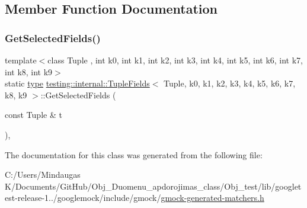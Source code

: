 \subsection{Member Function Documentation}
\mbox{\label{classtesting_1_1internal_1_1_tuple_fields_a020eefb4630e6dffe8bcadd0a70b1bab}} 
\subsubsection{\texorpdfstring{GetSelectedFields()}{GetSelectedFields()}}
{\footnotesize\ttfamily template$<$class Tuple , int k0, int k1, int k2, int k3, int k4, int k5, int k6, int k7, int k8, int k9$>$ \\
static \mbox{\hyperlink{classtesting_1_1internal_1_1_tuple_fields_a5480877377ebc94bf3a6c6cab5c369bc}{type}} \mbox{\hyperlink{classtesting_1_1internal_1_1_tuple_fields}{testing\+::internal\+::\+Tuple\+Fields}}$<$ Tuple, k0, k1, k2, k3, k4, k5, k6, k7, k8, k9 $>$\+::Get\+Selected\+Fields (\begin{DoxyParamCaption}\item[{const Tuple \&}]{t }\end{DoxyParamCaption})\hspace{0.3cm}{\ttfamily [inline]}, {\ttfamily [static]}}



The documentation for this class was generated from the following file\+:\begin{DoxyCompactItemize}
\item 
C\+:/\+Users/\+Mindaugas K/\+Documents/\+Git\+Hub/\+Obj\+\_\+\+Duomenu\+\_\+apdorojimas\+\_\+class/\+Obj\+\_\+test/lib/googletest-\/release-\/1../googlemock/include/gmock/\mbox{\hyperlink{_obj__test_2lib_2googletest-release-1_88_81_2googlemock_2include_2gmock_2gmock-generated-matchers_8h}{gmock-\/generated-\/matchers.\+h}}\end{DoxyCompactItemize}
